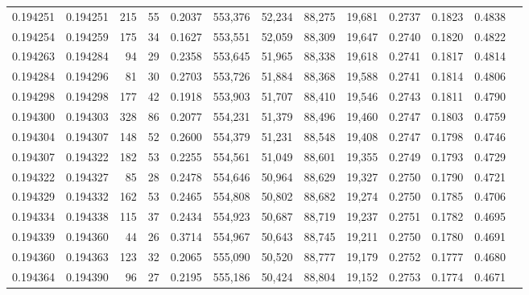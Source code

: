 \begin{tabular}{rrrrrrrrrrrrr}
0.194251 & 0.194251 &   215 &  55 &                                     0.2037 & 553,376 &  52,234 &  88,275 &  19,681 & 0.2737 & 0.1823 & 0.4838 \\
0.194254 & 0.194259 &   175 &  34 &                                     0.1627 & 553,551 &  52,059 &  88,309 &  19,647 & 0.2740 & 0.1820 & 0.4822 \\
0.194263 & 0.194284 &    94 &  29 &                                     0.2358 & 553,645 &  51,965 &  88,338 &  19,618 & 0.2741 & 0.1817 & 0.4814 \\
0.194284 & 0.194296 &    81 &  30 &                                     0.2703 & 553,726 &  51,884 &  88,368 &  19,588 & 0.2741 & 0.1814 & 0.4806 \\
0.194298 & 0.194298 &   177 &  42 &                                     0.1918 & 553,903 &  51,707 &  88,410 &  19,546 & 0.2743 & 0.1811 & 0.4790 \\
0.194300 & 0.194303 &   328 &  86 &                                     0.2077 & 554,231 &  51,379 &  88,496 &  19,460 & 0.2747 & 0.1803 & 0.4759 \\
0.194304 & 0.194307 &   148 &  52 &                                     0.2600 & 554,379 &  51,231 &  88,548 &  19,408 & 0.2747 & 0.1798 & 0.4746 \\
0.194307 & 0.194322 &   182 &  53 &                                     0.2255 & 554,561 &  51,049 &  88,601 &  19,355 & 0.2749 & 0.1793 & 0.4729 \\
0.194322 & 0.194327 &    85 &  28 &                                     0.2478 & 554,646 &  50,964 &  88,629 &  19,327 & 0.2750 & 0.1790 & 0.4721 \\
0.194329 & 0.194332 &   162 &  53 &                                     0.2465 & 554,808 &  50,802 &  88,682 &  19,274 & 0.2750 & 0.1785 & 0.4706 \\
0.194334 & 0.194338 &   115 &  37 &                                     0.2434 & 554,923 &  50,687 &  88,719 &  19,237 & 0.2751 & 0.1782 & 0.4695 \\
0.194339 & 0.194360 &    44 &  26 &                                     0.3714 & 554,967 &  50,643 &  88,745 &  19,211 & 0.2750 & 0.1780 & 0.4691 \\
0.194360 & 0.194363 &   123 &  32 &                                     0.2065 & 555,090 &  50,520 &  88,777 &  19,179 & 0.2752 & 0.1777 & 0.4680 \\
0.194364 & 0.194390 &    96 &  27 &                                     0.2195 & 555,186 &  50,424 &  88,804 &  19,152 & 0.2753 & 0.1774 & 0.4671 \\

\end{tabular}
